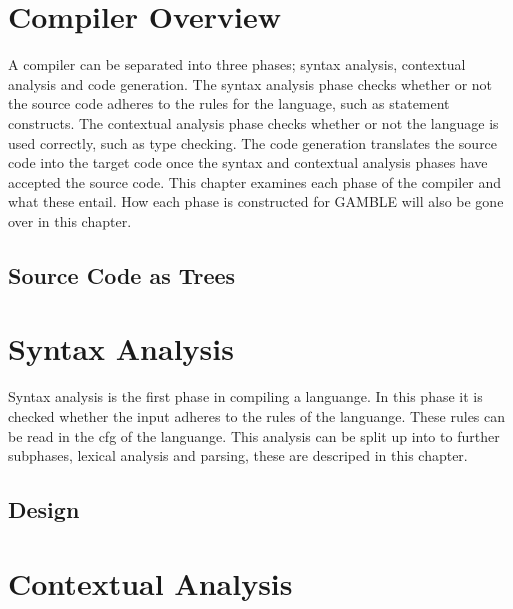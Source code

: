 \chapter{Compiler Overview}
A compiler can be separated into three phases; syntax analysis, contextual analysis and code generation.
The syntax analysis phase checks whether or not the source code adheres to the rules for the language, such as statement constructs.
The contextual analysis phase checks whether or not the language is used correctly, such as type checking.
The code generation translates the source code into the target code once the syntax and contextual analysis phases have accepted the source code.
This chapter examines each phase of the compiler and what these entail.
How each phase is constructed for GAMBLE will also be gone over in this chapter. %

\section{Source Code as Trees}


\chapter{Syntax Analysis}
Syntax analysis is the first phase in compiling a languange.
In this phase it is checked whether the input adheres to the rules of the languange.
These rules can be read in the \acrshort{cfg} of the languange.
This analysis can be split up into to further subphases, lexical analysis and parsing, these are descriped in this chapter.
\section{Design}









\chapter{Contextual Analysis}



